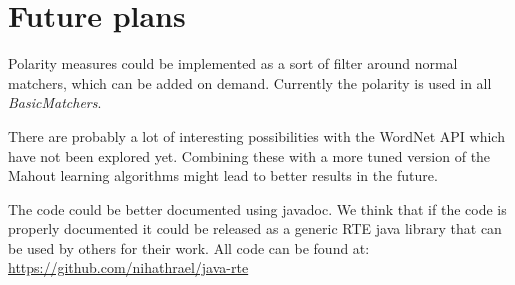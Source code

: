 \section{Future plans}
Polarity measures could be implemented as a sort of filter around normal matchers, which can be added on demand.
Currently the polarity is used in all \textit{BasicMatchers}.

There are probably a lot of interesting possibilities with the WordNet API which have not been explored yet. Combining
these with a more tuned version of the Mahout learning algorithms might lead to better results in the future.

The code could be better documented using javadoc. We think that if the code is properly documented it could be released as a generic RTE java library that can be used by
others for their work. All code can be found at: \url{https://github.com/nihathrael/java-rte}


